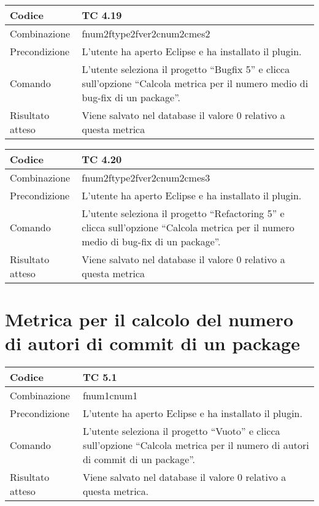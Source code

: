 \begin{table}[ht]
\begin{tabular}{|p{3cm}|p{9cm}|}
\hline
\cellcolor{lightgray}Codice				& TC 4.19								\\
\hline
\cellcolor{lightgray}Combinazione		& fnum2ftype2fver2cnum2cmes2 									\\
\hline
\cellcolor{lightgray}Precondizione		& L'utente ha aperto Eclipse e ha installato il plugin.								\\
\hline
\cellcolor{lightgray}Comando			& L'utente seleziona il progetto ``Bugfix 5''  e clicca sull'opzione ``Calcola metrica per il numero medio di bug-fix di un package''.	\\
\hline
\cellcolor{lightgray}Risultato atteso	& Viene salvato nel database il valore 0 relativo a questa metrica	\\
\hline
\end{tabular}
\end{table}

\begin{table}[ht]
\begin{tabular}{|p{3cm}|p{9cm}|}
\hline
\cellcolor{lightgray}Codice				& TC 4.20								\\
\hline
\cellcolor{lightgray}Combinazione		& fnum2ftype2fver2cnum2cmes3 									\\
\hline
\cellcolor{lightgray}Precondizione		& L'utente ha aperto Eclipse e ha installato il plugin.									\\
\hline
\cellcolor{lightgray}Comando			& L'utente seleziona il progetto ``Refactoring 5''  e clicca sull'opzione ``Calcola metrica per il numero medio di bug-fix di un package''.	\\
\hline
\cellcolor{lightgray}Risultato atteso	& Viene salvato nel database il valore 0 relativo a questa metrica	\\
\hline
\end{tabular}
\end{table}
\clearpage

\section{Metrica per il calcolo del numero di autori di commit di un package}

\begin{table}[ht]
\begin{tabular}{|p{3cm}|p{9cm}|}
\hline
\cellcolor{lightgray}Codice				& TC 5.1								\\
\hline
\cellcolor{lightgray}Combinazione		& fnum1cnum1									\\
\hline
\cellcolor{lightgray}Precondizione		& L'utente ha aperto Eclipse e ha installato il plugin.		\\
\hline
\cellcolor{lightgray}Comando			& L'utente seleziona il progetto ``Vuoto''  e clicca sull'opzione ``Calcola metrica per il numero di autori di commit di un package''.	\\
\hline
\cellcolor{lightgray}Risultato atteso	& Viene salvato nel database il valore 0 relativo a questa metrica.\\
\hline
\end{tabular}
\end{table}

